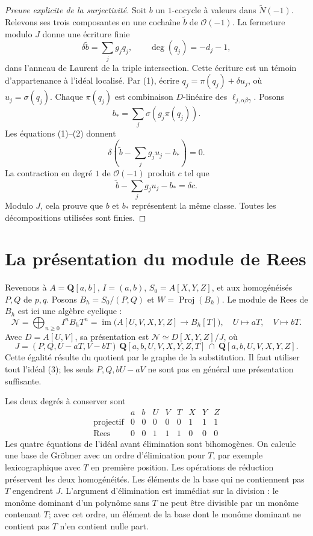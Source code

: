 \documentclass[11pt]{amsart}
\theoremstyle{remark}
\DeclareMathOperator{\im}{im}
\newcommand{\OO}{\mathcal O}
\begin{document}
\begin{proof}[Preuve explicite de la surjectivité]
Soit $b$ un $1$-cocycle à valeurs dans $\widetilde N(-1)$.
Relevons ses trois composantes en une cochaîne $\widetilde b$ de
$\OO(-1)$. La fermeture modulo $J$ donne une écriture finie
\[
 \delta\widetilde b=\sum_j g_j q_j,
 \qquad \deg(q_j)=-d_j-1,
 \tag{2}
\]
dans l'anneau de Laurent de la triple intersection.
Cette écriture est un témoin d'appartenance à l'idéal localisé.
Par (1), écrire $q_j=\pi(q_j)+\delta u_j$, où $u_j=\sigma(q_j)$.
Chaque $\pi(q_j)$ est combinaison $D$-linéaire des $\ell_{j,\alpha\beta\gamma}$.
Posons
\[
 b_* = \sum_j \sigma(g_j\pi(q_j)).
\]
Les équations (1)--(2) donnent
\[
 \delta\left(\widetilde b-\sum_jg_j u_j-b_*\right)=0.
\]
La contraction en degré $1$ de $\OO(-1)$ produit $c$ tel que
\[
 \widetilde b-\sum_jg_j u_j-b_*=\delta c.
\]
Modulo $J$, cela prouve que $b$ et $b_*$ représentent la même classe.
Toutes les décompositions utilisées sont finies.
\end{proof}

\section{La présentation du module de Rees}

Revenons à $A=\mathbf Q[a,b]$, $I=(a,b)$,
$S_0=A[X,Y,Z]$, et aux homogénéisés $P,Q$ de $p,q$.
Posons $B_h=S_0/(P,Q)$ et $W=\operatorname{Proj}(B_h)$.
Le module de Rees de $B_h$ est ici une algèbre cyclique :
\[
 \mathcal N=\bigoplus_{n\geq0}I^nB_hT^n
 =\im\bigl(A[U,V,X,Y,Z]\longrightarrow B_h[T]\bigr),
 \quad U\mapsto aT,\quad V\mapsto bT.
\]
Avec $D=A[U,V]$, sa présentation est $\mathcal N\simeq D[X,Y,Z]/J$,
où
\[
 J=(P,Q,U-aT,V-bT)\,\mathbf Q[a,b,U,V,X,Y,Z,T]
       \ \cap\ \mathbf Q[a,b,U,V,X,Y,Z].
 \tag{3}
\]
Cette égalité résulte du quotient par le graphe de la substitution.
Il faut utiliser tout l'idéal (3); les seuls $P,Q,bU-aV$ ne sont
pas en général une présentation suffisante.

Les deux degrés à conserver sont
\[
\begin{array}{c|rrrrrrrr}
 &a&b&U&V&T&X&Y&Z\\\hline
 \text{projectif}&0&0&0&0&0&1&1&1\\
 \text{Rees}&0&0&1&1&1&0&0&0
\end{array}
\]
Les quatre équations de l'idéal avant élimination sont bihomogènes.
On calcule une base de Gröbner avec un ordre d'élimination pour $T$,
par exemple lexicographique avec $T$ en première position.
Les opérations de réduction préservent les deux homogénéités.
Les éléments de la base qui ne contiennent pas $T$ engendrent $J$.
L'argument d'élimination est immédiat sur la division : le monôme
dominant d'un polynôme sans $T$ ne peut être divisible par un monôme
contenant $T$; avec cet ordre, un élément de la base dont le monôme
dominant ne contient pas $T$ n'en contient nulle part.
\end{document}
